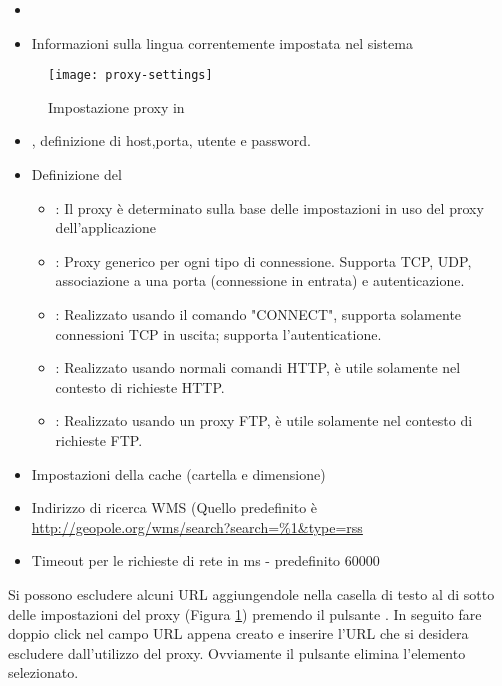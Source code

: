 
\begin{itemize}
\item {}
\item Informazioni sulla lingua correntemente impostata nel sistema
\end{itemize}


\begin{figure}[ht]
   \centering
   \texttt{[image: proxy-settings]}
   \caption{Impostazione proxy in \qg \nixcaption}
   \label{fig:proxy-settings}
\end{figure}

\begin{itemize}
\item {}, definizione di host,porta, utente e password.
\item Definizione del  
\begin{itemize}
  \item {}: Il proxy è determinato sulla base delle impostazioni in uso del proxy dell'applicazione
  \item {}: Proxy generico per ogni tipo di connessione. Supporta TCP, UDP, associazione a una porta (connessione in entrata) e autenticazione.
  \item {}: Realizzato usando il comando "CONNECT", supporta solamente connessioni TCP in uscita; supporta l'autenticatione.
  \item {}: Realizzato usando normali comandi HTTP, è utile solamente nel contesto di richieste HTTP.
  \item {}: Realizzato usando un proxy FTP, è utile solamente nel contesto di richieste FTP.
 \end{itemize}
\item Impostazioni della cache (cartella e dimensione)
\item Indirizzo di ricerca WMS (Quello predefinito è \url{http://geopole.org/wms/search?search=\%1\&type=rss}
\item Timeout per le richieste di rete in ms - predefinito 60000
\end{itemize}

Si possono escludere alcuni URL aggiungendole nella casella di testo al di sotto delle impostazioni del proxy 
(Figura \ref{fig:proxy-settings}) premendo il pulsante . In seguito 
fare doppio click nel campo URL appena creato e inserire l'URL che si desidera
escludere dall'utilizzo del proxy. Ovviamente il pulsante  elimina l'elemento selezionato.


